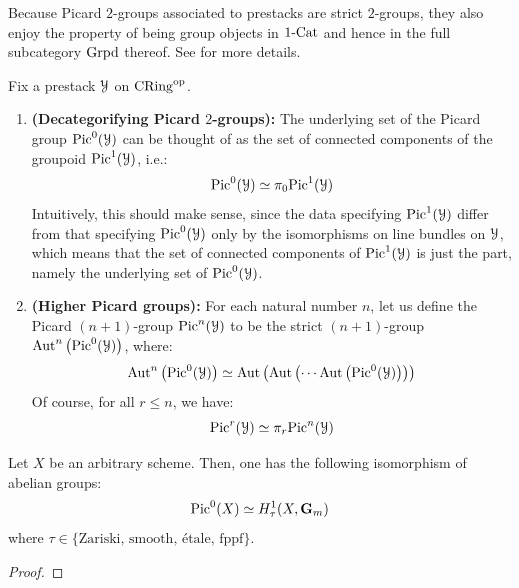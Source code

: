                 \begin{remark} \label{remark: picard_2_groups_are_groups_in_Cat}
                    Because Picard $2$-groups associated to prestacks are strict $2$-groups, they also enjoy the property of being group objects in $1\text{-}\mathrm{Cat}$ and hence in the full subcategory $\mathrm{Grpd}$ thereof. See \cite{nlab:strict_2-group} for more details.
                \end{remark}
                \begin{remark}
                    Fix a prestack $\mathcal{Y}$ on $\mathrm{CRing}^{\mathrm{op}}$.
                    \begin{enumerate}
                        \item \textbf{(Decategorifying Picard $2$-groups):} The underlying set of the Picard group $\mathrm{Pic}^0(\mathcal{Y})$ can be thought of as the set of connected components of the groupoid $\mathrm{Pic}^1(\mathcal{Y})$, i.e.:
                            $$\mathrm{Pic}^0(\mathcal{Y}) \simeq \pi_0\mathrm{Pic}^1(\mathcal{Y})$$
                        Intuitively, this should make sense, since the data specifying $\mathrm{Pic}^1(\mathcal{Y})$ differ from that specifying $\mathrm{Pic}^0(\mathcal{Y})$ only by the  isomorphisms on line bundles on $\mathcal{Y}$, which means that the set of connected components of $\mathrm{Pic}^1(\mathcal{Y})$ is just the  part, namely the underlying set of $\mathrm{Pic}^0(\mathcal{Y})$. 
                        \item \textbf{(Higher Picard groups):} For each natural number $n$, let us define the Picard $(n + 1)$-group $\mathrm{Pic}^n(\mathcal{Y})$ to be the strict $(n + 1)$-group $\mathrm{Aut}^n\left(\mathrm{Pic}^0(\mathcal{Y})\right)$, where:
                            $$\mathrm{Aut}^n\left(\mathrm{Pic}^0(\mathcal{Y})\right) \simeq \mathrm{Aut}\left( \mathrm{Aut}\left( \cdots \mathrm{Aut}\left(\mathrm{Pic}^0(\mathcal{Y})\right) \right) \right)$$
                        Of course, for all $r \leq n$, we have:
                            $$\mathrm{Pic}^r(\mathcal{Y}) \simeq \pi_r\mathrm{Pic}^n(\mathcal{Y})$$
                    \end{enumerate}
                \end{remark}
                
                \begin{theorem} \label{theorem: hilbert_90}
                    Let $X$ be an arbitrary scheme. Then, one has the following isomorphism of abelian groups:
                        $$\mathrm{Pic}^0(X) \simeq H^1_{\tau}(X, \mathbf{G}_m)$$
                    where $\tau \in \{\text{Zariski, smooth, \'etale, fppf}\}$.
                \end{theorem}
                    \begin{proof}
                        
                    \end{proof}
                
